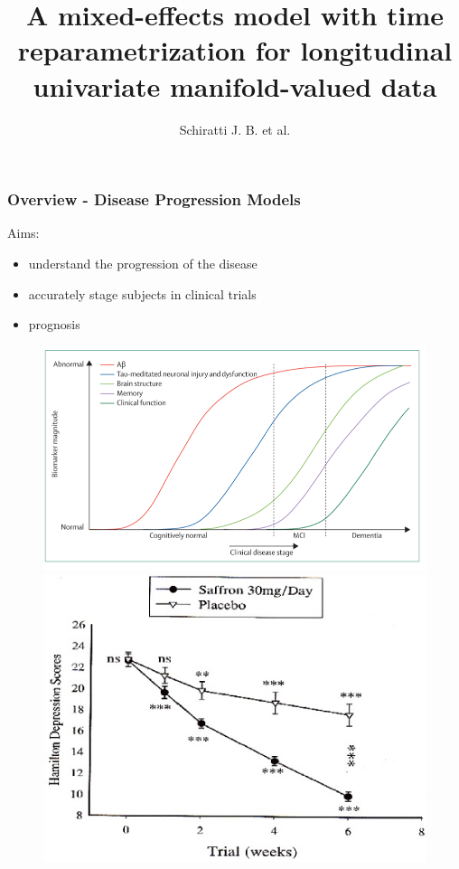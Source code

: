 \documentclass[10pt,xcolor=table]{beamer}
\title{A mixed-effects model with time reparametrization for longitudinal univariate manifold-valued data}
\author{Schiratti J. B. et al.}
\institute{IPMI 2015}
\begin{document}
 
\frame{\titlepage}
 


\begin{frame}
\frametitle{Overview - Disease Progression Models}

Aims: 
\begin{itemize}
  \item understand the progression of the disease
  \item accurately stage subjects in clinical trials
  \item prognosis
\end{itemize}

\begin{figure}
\includegraphics[scale=0.25]{jack_curves.png}
\includegraphics[scale=1]{drug_progression.jpg}
\end{figure}

\end{frame}
\end{document}
